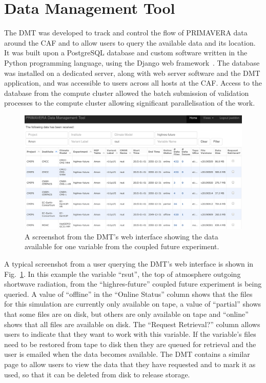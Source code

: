 \documentclass[gmd, manuscript]{copernicus}
\begin{document}
\section{Data Management Tool}

The DMT was developed to track and control the flow of PRIMAVERA data around the CAF and to allow users to query the available data and its location. It was built upon a PostgreSQL database and custom software written in the Python programming language, using the Django web framework~\citep{Django}. The database was installed on a dedicated server, along with web server software and the DMT application, and was accessible to users across all hosts at the CAF. Access to the database from the compute cluster allowed the batch submission of validation processes to the  compute cluster allowing significant parallelisation of the work.

\begin{figure}[ht]
	\includegraphics[width=12cm]{fig03.png}
	\caption{A screenshot from the DMT's web interface showing the data available for one variable from the coupled future experiment.}
	\label{dmt_query}
\end{figure}

A typical screenshot from a user querying the DMT's web interface is shown in Fig.~\ref{dmt_query}. In this example the variable ``rsut'', the top of atmosphere outgoing shortwave radiation, from the ``highres-future'' coupled future experiment is being queried. A value of ``offline'' in the ``Online Status'' column shows that the files for this simulation are currently only available on tape, a value of ``partial'' shows that some files are on disk, but others are only available on tape and ``online'' shows that all files are available on disk. The ``Request Retrieval?'' column allows users to indicate that they want to work with this variable. If the variable's files need to be restored from tape to disk then they are queued for retrieval and the user is emailed when the data becomes available. The DMT contains a similar page to allow users to view the data that they have requested and to mark it as used, so that it can be deleted from disk to release storage.
\end{document}
